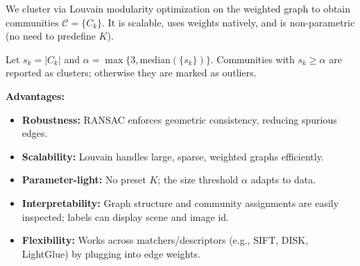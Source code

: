 \documentclass[report.tex]{subfiles}
\begin{document}
We cluster via Louvain modularity optimization on the weighted graph to obtain communities \(\mathcal{C} = \{C_k\}\).
It is scalable, uses weights natively, and is non-parametric (no need to predefine \(K\)).

Let \(s_k = |C_k|\) and \(\alpha = \max\{3, \mathrm{median}(\{s_k\})\}\).
Communities with \(s_k \ge \alpha\) are reported as clusters; otherwise they are marked as outliers.

\textbf{Advantages:}
\begin{itemize}
  \item \textbf{Robustness:} RANSAC enforces geometric consistency, reducing spurious edges.
  \item \textbf{Scalability:} Louvain handles large, sparse, weighted graphs efficiently.
  \item \textbf{Parameter-light:} No preset \(K\); the size threshold \(\alpha\) adapts to data.
  \item \textbf{Interpretability:} Graph structure and community assignments are easily inspected; labels can display scene and image id.
  \item \textbf{Flexibility:} Works across matchers/descriptors (e.g., SIFT, DISK, LightGlue) by plugging into edge weights.
\end{itemize}
\end{document}
